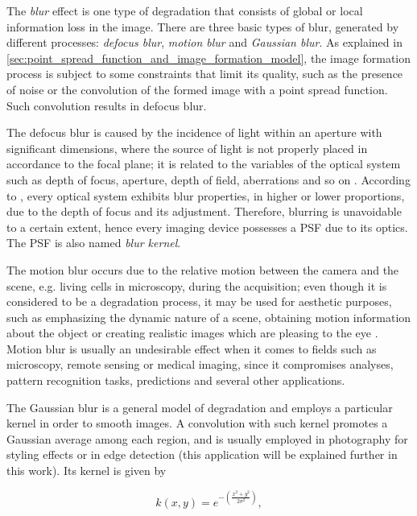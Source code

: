 The \emph{blur} effect is one type of degradation that consists of global or local information loss in the image. There are three basic types of blur, generated by different processes: \emph{defocus blur}, \emph{motion blur} and \emph{Gaussian blur}. As explained in \autoref{sec:point_spread_function_and_image_formation_model}, the image formation process is subject to some constraints that limit its quality, such as the presence of noise or the convolution of the formed image with a point spread function. Such convolution results in defocus blur. 

The defocus blur is caused by the incidence of light within an aperture with significant dimensions, where the source of light is not properly placed in accordance to the focal plane; it is related to the variables of the optical system such as depth of focus, aperture, depth of field, aberrations and so on \cite{joshi2014defocus}. According to , every optical system exhibits blur properties, in higher or lower proportions, due to the depth of focus and its adjustment. Therefore, blurring is unavoidable to a certain extent, hence every imaging device possesses a PSF due to its optics. The PSF is also named \emph{blur kernel}.

The motion blur occurs due to the relative motion between the camera and the scene, e.g. living cells in microscopy, during the acquisition; even though it is considered to be a degradation process, it may be used for aesthetic purposes, such as emphasizing the dynamic nature of a scene, obtaining motion information about the object or creating realistic images which are pleasing to the eye \cite{nayar2004motion}. Motion blur is usually an undesirable effect when it comes to fields such as microscopy, remote sensing or medical imaging, since it compromises analyses, pattern recognition tasks, predictions and several other applications.

The Gaussian blur is a general model of degradation and employs a particular kernel in order to smooth images. A convolution with such kernel promotes a Gaussian average among each region, and is usually employed in photography for styling effects or in edge detection (this application will be explained further in this work). Its kernel \cite{nixon2019feature} is given by

\begin{equation}
\label{eqn:gaussian_blur}
k(x,y) = e^{-
            \left( 
                \frac{x^{2} + y^{2}}{2 \sigma^{2}}
            \right)
            },
\end{equation}

